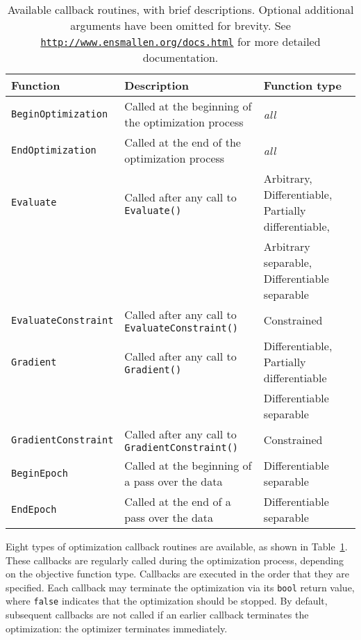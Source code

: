 \begin{table}[!tb]
\centering
\small
\begin{tabular}{lll}
\toprule
{\bf Function} & {\bf Description} & {\bf Function type} \\
\hline
\texttt{BeginOptimization}   & Called at the beginning of the optimization process  & {\it all} \\
\texttt{EndOptimization}     & Called at the end of the optimization process & {\it all} \\
\texttt{Evaluate}            & Called after any call to {\tt Evaluate()}            & Arbitrary, Differentiable, Partially differentiable,  \\
                             &                                                      & Arbitrary separable, Differentiable separable \\
\texttt{EvaluateConstraint}  & Called after any call to {\tt EvaluateConstraint()}  & Constrained \\
\texttt{Gradient}            & Called after any call to {\tt Gradient()}            & Differentiable, Partially differentiable \\
                             &                                                      & Differentiable separable \\
\texttt{GradientConstraint}  & Called after any call to {\tt GradientConstraint()}  & Constrained \\
\texttt{BeginEpoch}          & Called at the beginning of a pass over the data      & Differentiable separable \\
\texttt{EndEpoch}            & Called at the end of a pass over the data            & Differentiable separable \\

\bottomrule
\end{tabular}
\vspace{0.5ex}
\caption
  {
  Available callback routines, with brief descriptions.
  Optional additional arguments have been omitted for brevity.
  See {\href{http://www.ensmallen.org/docs.html}{\mbox{\tt http://www.ensmallen.org/docs.html}}} for more detailed documentation.
  }
\label{tab:callback_list}
\end{table}

Eight types of optimization callback routines are available,
as shown in Table~\ref{tab:callback_list}.
These callbacks are regularly called during the optimization process,
depending on the objective function type.
Callbacks are executed in the order that they are specified.
Each callback may terminate the optimization via its {\tt bool} return value,
where {\tt false} indicates that the optimization should be stopped.
By default, subsequent callbacks are not called if an earlier callback terminates
the optimization: the optimizer terminates immediately.

